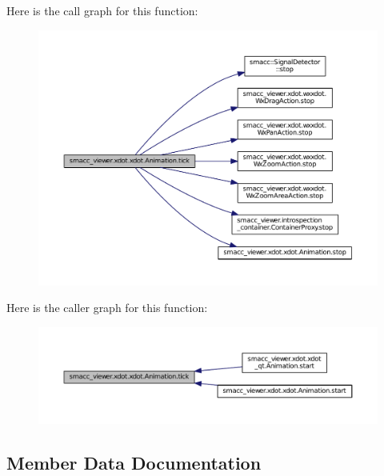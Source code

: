 Here is the call graph for this function\+:
\nopagebreak
\begin{figure}[H]
\begin{center}
\leavevmode
\includegraphics[width=350pt]{classsmacc__viewer_1_1xdot_1_1xdot_1_1Animation_abe947b684db8e263f38c3f4e3a5831b7_cgraph}
\end{center}
\end{figure}




Here is the caller graph for this function\+:
\nopagebreak
\begin{figure}[H]
\begin{center}
\leavevmode
\includegraphics[width=350pt]{classsmacc__viewer_1_1xdot_1_1xdot_1_1Animation_abe947b684db8e263f38c3f4e3a5831b7_icgraph}
\end{center}
\end{figure}




\subsection{Member Data Documentation}
